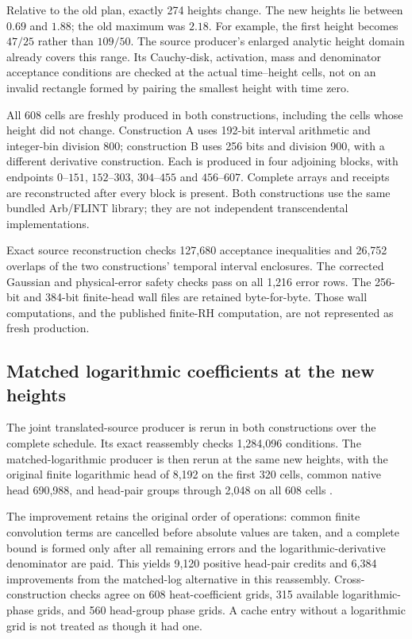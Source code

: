 \documentclass[11pt,a4paper]{article}
\theoremstyle{definition}\newtheorem{definition}[theorem]{Definition}
\theoremstyle{remark}\newtheorem{remark}[theorem]{Remark}
\begin{document}
Relative to the old plan, exactly 274 heights change. The new heights
lie between $0.69$ and $1.88$; the old maximum was $2.18$.
For example, the first height becomes $47/25$ rather than $109/50$.
The source producer's enlarged analytic height domain already covers
this range. Its Cauchy-disk, activation, mass and denominator acceptance
conditions are checked at the actual time--height cells, not on an
invalid rectangle formed by pairing the smallest height with time zero.

All 608 cells are freshly produced in both constructions, including the
cells whose height did not change. Construction A uses 192-bit interval
arithmetic and integer-bin division 800; construction B uses 256 bits
and division 900, with a different derivative construction. Each is
produced in four adjoining blocks, with endpoints $0$--$151$,
$152$--$303$, $304$--$455$ and $456$--$607$. Complete arrays and receipts
are reconstructed after every block is present.
Both constructions use the same bundled Arb/FLINT library; they are not
independent transcendental implementations.

Exact source reconstruction checks 127,680 acceptance inequalities and
26,752 overlaps of the two constructions' temporal interval enclosures.
The corrected Gaussian and physical-error safety checks pass on all
1,216 error rows. The 256-bit and 384-bit finite-head wall files are
retained byte-for-byte. Those wall computations, and the published
finite-RH computation, are not represented as fresh production.

\subsection{Matched logarithmic coefficients at the new heights}
The joint translated-source producer is rerun in both constructions over
the complete schedule. Its exact reassembly checks 1,284,096 conditions.
The matched-logarithmic producer is then rerun at the same new heights,
with the original finite logarithmic head of 8,192 on the first 320
cells, common native head 690,988, and head-pair groups through 2,048 on
all 608 cells \cite{matchedsource}.

The improvement retains the original order of operations: common finite
convolution terms are cancelled before absolute values are taken, and a
complete bound is formed only after all remaining errors and the
logarithmic-derivative denominator are paid. This yields 9,120 positive
head-pair credits and 6,384 improvements from the matched-log alternative
in this reassembly. Cross-construction checks agree on 608 heat-coefficient
grids, 315 available logarithmic-phase grids, and 560 head-group phase
grids. A cache entry without a logarithmic grid is not treated as though
it had one.
\end{document}
